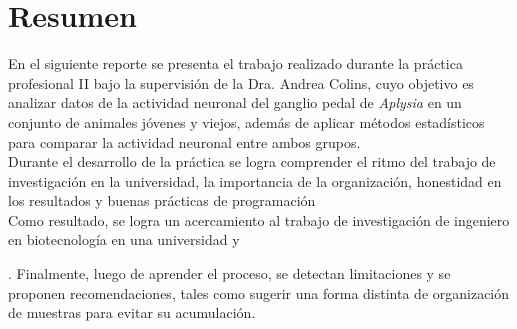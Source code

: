 \section*{Resumen}

En el siguiente reporte se presenta el trabajo realizado durante la práctica profesional II bajo la supervisión de la Dra. Andrea Colins, cuyo objetivo es analizar datos de la actividad neuronal del ganglio pedal de \textit{Aplysia} en un conjunto de animales jóvenes y viejos, además de aplicar métodos estadísticos para comparar la actividad neuronal entre ambos grupos.\\

Durante el desarrollo de la práctica se logra comprender el ritmo del trabajo de investigación en la universidad, la importancia de la organización, honestidad en los resultados y buenas prácticas de programación \\

Como resultado, se logra un acercamiento al trabajo de investigación de ingeniero en biotecnología en una universidad y 

. Finalmente, luego de aprender el proceso, se detectan limitaciones y se proponen recomendaciones, tales como sugerir una forma distinta de organización de muestras para evitar su acumulación.



